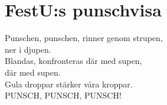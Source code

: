 \section{FestU:s punschvisa}
Punschen, punschen, rinner genom strupen,\\
ner i djupen.\\
Blandas, konfronteras där med supen,\\
där med supen.\\
Gula droppar stärker våra kroppar.\\
PUNSCH, PUNSCH, PUNSCH!\\